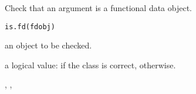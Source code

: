 \begin{Description}\relax
Check that an argument is a functional data object.
\end{Description}
\begin{Usage}
\begin{verbatim}
is.fd(fdobj)
\end{verbatim}
\end{Usage}
\begin{Arguments}
\begin{ldescription}
\item[\code{fdobj}] an object to be checked.

\end{ldescription}
\end{Arguments}
\begin{Value}
a logical value:
 if the class is correct,  otherwise.
\end{Value}
\begin{SeeAlso}\relax
{}, 
, 
\end{SeeAlso}

